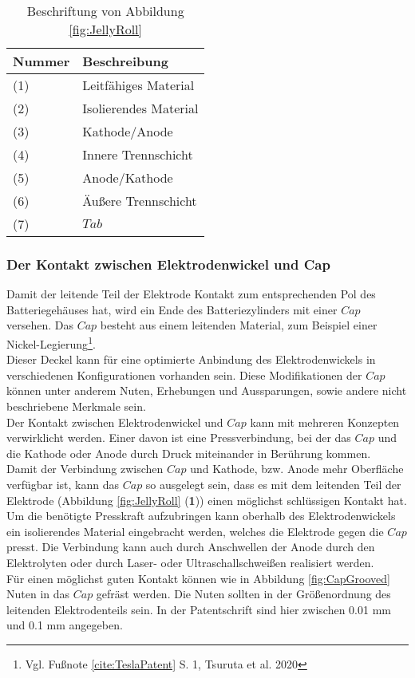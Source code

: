 \begin{table}[h!]
	\caption{Beschriftung von Abbildung \ref{fig:JellyRoll}}
	\label{tab:BeschriftungJellyRoll}
	\vspace{0.2cm}	
	\begin{tabularx}{\textwidth}{ |X|X|  }
		\toprule[1.5pt]
		\textbf{Nummer} & \textbf{Beschreibung} \\
		\hline\hline
		(1) & Leitfähiges Material \\
		\hline
		(2) & Isolierendes Material\\
		\hline
		(3) & Kathode/Anode\\
		\hline
		(4) & Innere Trennschicht\\
		\hline
		(5) & Anode/Kathode\\
		\hline
		(6) & Äußere Trennschicht\\
		\hline
		(7) & $Tab$\\
		\bottomrule[1.5pt]
	\end{tabularx}		
\end{table}

\subsubsection*{Der Kontakt zwischen Elektrodenwickel und Cap}\label{subsub:JellyrollCapContact}

Damit der leitende Teil der Elektrode Kontakt zum entsprechenden Pol des Batteriegehäuses hat, wird ein Ende des Batteriezylinders mit einer $Cap$ versehen. Das $Cap$ besteht aus einem leitenden Material, zum Beispiel einer Nickel-Legierung\footnote{Vgl. Fußnote \ref{cite:TeslaPatent} S. 1, Tsuruta et al. 2020}.\\
Dieser Deckel kann für eine optimierte Anbindung des Elektrodenwickels in verschiedenen Konfigurationen vorhanden sein. Diese Modifikationen der $Cap$ können unter anderem Nuten, Erhebungen und Aussparungen, sowie andere nicht beschriebene Merkmale sein.\\
Der Kontakt zwischen Elektrodenwickel und $Cap$ kann mit mehreren Konzepten verwirklicht werden. Einer davon ist eine Pressverbindung, bei der das $Cap$ und die Kathode oder Anode durch Druck miteinander in Berührung kommen.\\
Damit der Verbindung zwischen $Cap$ und Kathode, bzw. Anode mehr Oberfläche verfügbar ist, kann das $Cap$ so ausgelegt sein, dass es mit dem leitenden Teil der Elektrode (Abbildung \ref{fig:JellyRoll} (\textbf{1})) einen möglichst schlüssigen Kontakt hat. Um die benötigte Presskraft aufzubringen kann oberhalb des Elektrodenwickels ein isolierendes Material eingebracht werden, welches die Elektrode gegen die $Cap$ presst. Die Verbindung kann auch durch Anschwellen der Anode durch den Elektrolyten oder durch Laser- oder Ultraschallschweißen realisiert werden.\\
Für einen möglichst guten Kontakt können wie in Abbildung \ref{fig:CapGrooved} Nuten in das $Cap$ gefräst werden. Die Nuten sollten in der Größenordnung des leitenden Elektrodenteils sein. In der Patentschrift sind hier zwischen 0.01 mm und 0.1 mm angegeben.\\

